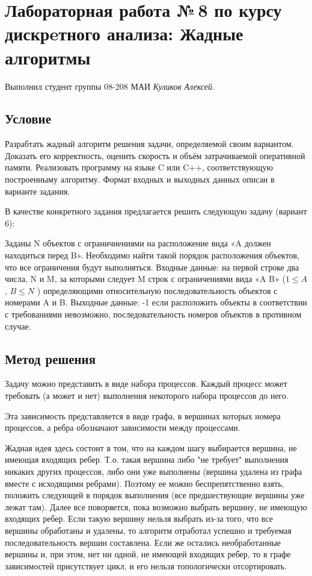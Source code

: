 \documentclass[12pt]{article}
\begin{document}
\section*{Лабораторная работа №\,8 по курсу дискрeтного анализа: Жадные алгоритмы}

Выполнил студент группы 08-208 МАИ \textit{Куликов Алексей}.

\subsection*{Условие}

Разрабтать жадный алгоритм решения задачи, определяемой своим
вариантом. Доказать его корректность, оценить скорость и объём
затрачиваемой оперативной памяти.
Реализовать программу на языке C или C++, соответствующую
построенныму алгоритму. Формат входных и выходных данных описан в варианте задания.

В качестве конкретного задания предлагается решить следующую задачу (вариант 6): 

Заданы N объектов с ограничиениями на расположение вида «A должен
находиться перед B». Необходимо найти такой порядок расположения
объектов, что все ограничения будут выполняться. Входные данные: на
первой строке два числа, N и M, за которыми следует M строк с
ограничениями вида «A B» ($1 \leq A$, $B \leq N$ ) определяющими
относительную последовательность объектов с номерами A и B.
Выходные данные: -1 если расположить объекты в соответствии с
требованиями невозможно, последовательность номеров объектов в
противном случае.

\subsection*{Метод решения}

Задачу можно представить в виде набора процессов. Каждый процесс может требовать (а может и нет) выполнения некоторого набора процессов до него. 

Эта зависимость представляется в виде графа, в вершинах которых номера процессов, а ребра обозначают зависимости между процессами.

Жадная идея здесь состоит в том, что на каждом шагу выбирается вершина, не имеющая входящих ребер. Т.о. такая вершина либо "не требует" выполнения никаких других процессов, либо они уже выполнены (вершина удалена из графа вместе с исходящими ребрами). Поэтому ее можно беспрепятственно взять, положить следующей в порядок выполнения (все предшествующие вершины уже лежат там). Далее все поворяется, пока возможно выбрать вершину, не имеющую входящих ребер. Если такую вершину нельзя выбрать из-за того, что все вершины обработаны и удалены, то алгоритм отработал успешно и требуемая последовательность вершин составлена. Если же остались необработанные вершины и, при этом, нет ни одной, не имеющей входящих ребер, то в графе зависимостей присутствует цикл, и его нельзя топологически отсортировать. 
\end{document}
